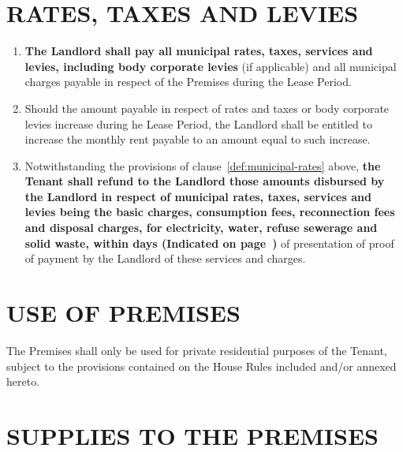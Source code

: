 \documentclass[11pt]{article}
\begin{document}
\section{\uppercase{rates, taxes and levies}}
\label{sec:rates-taxes-levies}

\begin{enumerate}
	\item \textbf{The Landlord shall pay all municipal rates, taxes, services and levies, including body corporate levies} (if applicable) and all municipal charges payable in respect of the Premises during the Lease Period. \label{def:municipal-rates}
	\item Should the amount payable in respect of rates and taxes or body corporate levies increase during he Lease Period, the Landlord shall be entitled to increase the monthly rent payable to an amount equal to such increase.
	\item Notwithstanding the provisions of clause~\ref{def:municipal-rates} above, \textbf{the Tenant shall refund to the Landlord those amounts disbursed by the Landlord in respect of municipal rates, taxes, services and levies being the basic charges, consumption fees, reconnection fees and disposal charges, for electricity, water, refuse sewerage and solid waste, within \underline{\hspace{2em}} days (Indicated on page~\pageref{input:municipal-rates})} of presentation of proof of payment by the Landlord of these services and charges.
\end{enumerate}

\section{\uppercase{use of premises}}
\label{sec:use-of-premises}

The Premises shall only be used for private residential purposes of the Tenant, subject to the provisions contained on the House Rules included and/or annexed hereto.

\section{\uppercase{supplies to the premises}}
\label{sec:supplies-to-the-premises}
\end{document}
